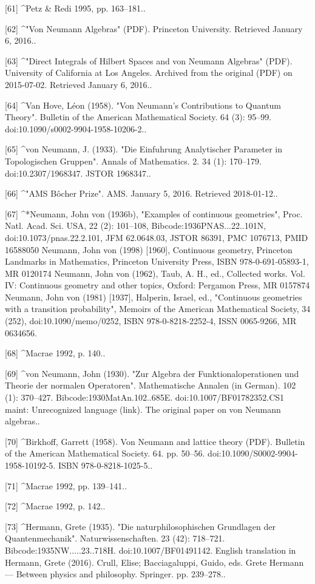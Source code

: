 [61]
^Petz & Redi 1995, pp. 163–181..

[62]
^"Von Neumann Algebras" (PDF). Princeton University. Retrieved January 6, 2016..

[63]
^"Direct Integrals of Hilbert Spaces and von Neumann Algebras" (PDF). University of California at Los Angeles. Archived from the original (PDF) on 2015-07-02. Retrieved January 6, 2016..

[64]
^Van Hove, Léon (1958). "Von Neumann's Contributions to Quantum Theory". Bulletin of the American Mathematical Society. 64 (3): 95–99. doi:10.1090/s0002-9904-1958-10206-2..

[65]
^von Neumann, J. (1933). "Die Einfuhrung Analytischer Parameter in Topologischen Gruppen". Annals of Mathematics. 2. 34 (1): 170–179. doi:10.2307/1968347. JSTOR 1968347..

[66]
^"AMS Bôcher Prize". AMS. January 5, 2016. Retrieved 2018-01-12..

[67]
^*Neumann, John von (1936b), "Examples of continuous geometries", Proc. Natl. Acad. Sci. USA, 22 (2): 101–108, Bibcode:1936PNAS...22..101N, doi:10.1073/pnas.22.2.101, JFM 62.0648.03, JSTOR 86391, PMC 1076713, PMID 16588050 Neumann, John von (1998) [1960], Continuous geometry, Princeton Landmarks in Mathematics, Princeton University Press, ISBN 978-0-691-05893-1, MR 0120174 Neumann, John von (1962), Taub, A. H., ed., Collected works. Vol. IV: Continuous geometry and other topics, Oxford: Pergamon Press, MR 0157874 Neumann, John von (1981) [1937], Halperin, Israel, ed., "Continuous geometries with a transition probability", Memoirs of the American Mathematical Society, 34 (252), doi:10.1090/memo/0252, ISBN 978-0-8218-2252-4, ISSN 0065-9266, MR 0634656.

[68]
^Macrae 1992, p. 140..

[69]
^von Neumann, John (1930). "Zur Algebra der Funktionaloperationen und Theorie der normalen Operatoren". Mathematische Annalen (in German). 102 (1): 370–427. Bibcode:1930MatAn.102..685E. doi:10.1007/BF01782352.CS1 maint: Unrecognized language (link). The original paper on von Neumann algebras..

[70]
^Birkhoff, Garrett (1958). Von Neumann and lattice theory (PDF). Bulletin of the American Mathematical Society. 64. pp. 50–56. doi:10.1090/S0002-9904-1958-10192-5. ISBN 978-0-8218-1025-5..

[71]
^Macrae 1992, pp. 139–141..

[72]
^Macrae 1992, p. 142..

[73]
^Hermann, Grete (1935). "Die naturphilosophischen Grundlagen der Quantenmechanik". Naturwissenschaften. 23 (42): 718–721. Bibcode:1935NW.....23..718H. doi:10.1007/BF01491142. English translation in Hermann, Grete (2016). Crull, Elise; Bacciagaluppi, Guido, eds. Grete Hermann — Between physics and philosophy. Springer. pp. 239–278..

